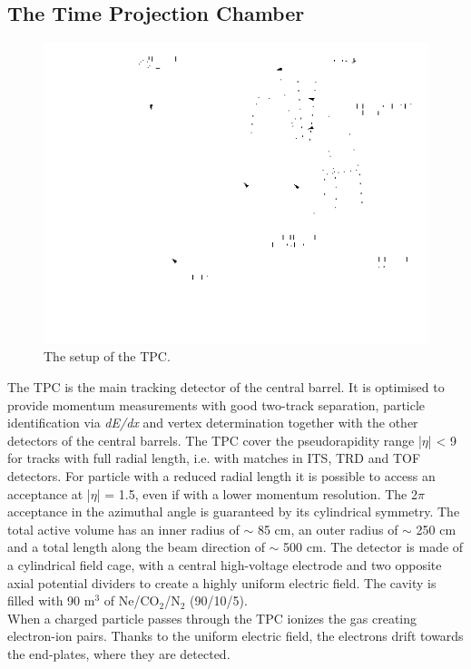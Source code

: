 \subsection*{The Time Projection Chamber}
%
\begin{figure}
  \centering
  \includegraphics[scale=0.5]{figures/tpc.png}
  \caption{The setup of the TPC.}
  \label{fig:TPC}
\end{figure}
%
The TPC is the main tracking detector of the central barrel. It is optimised to provide momentum measurements with good two-track separation, particle identification via \textit{dE/dx} and vertex determination together with the other detectors of the central barrels. The TPC cover the pseudorapidity range |$\eta$| < 9 for tracks with full radial length, i.e. with matches in ITS, TRD and TOF detectors. For particle with a reduced radial length it is possible to access an acceptance at |$\eta$| = 1.5, even if with a lower momentum resolution. The 2$\pi$ acceptance in the azimuthal angle is guaranteed by its cylindrical symmetry. The total active volume has an inner radius of $\sim$ 85 cm, an outer radius of $\sim$ 250 cm and a total length along the beam direction of $\sim$ 500 cm. The detector is made of a cylindrical field cage, with a central high-voltage electrode and two opposite axial potential dividers to create a highly uniform electric field. The cavity is filled with 90 m$^3$ of Ne/CO$_2$/N$_2$ (90/10/5).\\
When a charged particle passes through the TPC ionizes the gas creating electron-ion pairs. Thanks to the uniform electric field, the electrons drift towards the end-plates, where they are detected.
